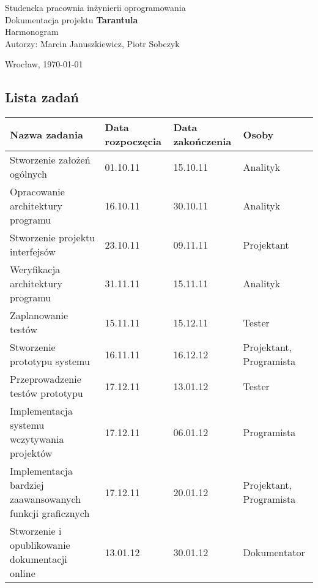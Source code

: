 \documentclass[11pt,leqno]{article}
\begin{document}
\begin{center}
\thispagestyle{empty}
{\Large Studencka pracownia inżynierii oprogramowania}\\[2.5cm]

{\huge Dokumentacja projektu \textbf{Tarantula}}\\[0.25cm]
{\huge Harmonogram}\\[0.5cm]

Autorzy: Marcin Januszkiewicz, Piotr Sobczyk
\vfill

{\large Wrocław, \today}

\end{center}

\newpage
\tableofcontents
\newpage
\begin{landscape}
\section{Lista zadań}
\begin{tabular}{|p{10cm}|l|l|l|}
\hline
Nazwa zadania & Data rozpoczęcia & Data zakończenia & Osoby \\ \hline
Stworzenie założeń ogólnych & 01.10.11 & 15.10.11 & Analityk \\ \hline
Opracowanie architektury programu & 16.10.11 & 30.10.11 & Analityk \\ \hline
Stworzenie projektu interfejsów & 23.10.11 & 09.11.11 & Projektant \\ \hline
Weryfikacja architektury programu & 31.11.11 & 15.11.11 & Analityk \\ \hline
Zaplanowanie testów & 15.11.11 & 15.12.11 & Tester \\ \hline
Stworzenie prototypu systemu & 16.11.11 & 16.12.12 & Projektant, Programista \\ \hline
Przeprowadzenie testów prototypu & 17.12.11 & 13.01.12 & Tester \\ \hline
Implementacja systemu wczytywania projektów & 17.12.11 & 06.01.12 & Programista \\ \hline
Implementacja bardziej zaawansowanych funkcji graficznych & 17.12.11 & 20.01.12 & Projektant, Programista \\ \hline
Stworzenie i opublikowanie dokumentacji online & 13.01.12 & 30.01.12 & Dokumentator \\ \hline
\end{tabular}
\end{landscape}
\end{document}
